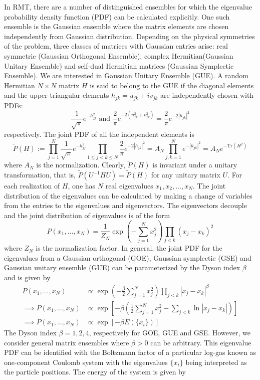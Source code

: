\documentclass[11pt]{article}
\begin{document}
In RMT, there are a number of distinguished ensembles for which the eigenvalue probability density function (PDF) can be calculated explicitly. One such ensemble is the Gaussian ensemble where the matrix elements are chosen independently from Gaussian distribution. Depending on the physical symmetries of the problem, three classes of matrices with Gaussian entries arise\cite{ref:mehta}: real symmetric (Gaussian Orthogonal Ensemble), complex Hermitian(Gaussian Unitary Ensemble) and self-dual Hermitian matrices (Gaussian Symplectic Ensemble). We are interested in Gaussian Unitary Ensemble (GUE). A random Hermitian $N\times N$ matrix $H$ is said to belong to the GUE if the diagonal elements and the upper triangular elements $h_{jk}=u_{jk}+iv_{jk}$ are independently chosen with PDFs:
$$
\frac{1}{\sqrt{\pi}}e^{-h_{jj}^2}\textrm{ and }\frac{2}{\pi}e^{-2(u_{jk}^2+v_{jk}^2)}=\frac{2}{\pi}e^{-2|h_{jk}|^2}
$$
respectively. The joint PDF of all the independent elements is
$$
\tilde{P}(H):=\prod_{j=1}^N\frac{1}{\sqrt{\pi}}e^{-h_{jj}^2}\prod_{1\leq j<k\leq N}\frac{2}{\pi}e^{-2|h_{jk}|^2} = A_N \prod_{j,k=1}^Ne^{-|h_{jk}|^2}= A_Ne^{-\textrm{Tr}(H^2)}
$$
where $A_N$ is the normalization. Clearly, $\tilde{P}(H)$ is invariant under a unitary transformation, that is, $\tilde{P}(U^{-1}HU)=\tilde{P}(H)$ for any unitary matrix $U$. For each realization of $H$, one has $N$ real eigenvalues $x_1,x_2,\dots,x_N$. The joint distribution of the eigenvalues can be calculated by making a change of variables from the entries to the eigenvalues and eigenvectors\cite{ref:mehta}. The eigenvectors decouple and the joint distribution of eigenvalues is of the form
\begin{equation}
P(x_1,\dots,x_N) = \frac{1}{Z_N}\exp\left(-\sum_{j=1}^Nx_j^2\right)\prod_{j<k}(x_j-x_k)^2
\end{equation} 
where $Z_N$ is the normalization factor. In general, the joint PDF for the eigenvalues from a Gaussian orthogonal (GOE), Gaussian symplectic (GSE) and Gaussian unitary ensemble (GUE) can be parameterized by the Dyson index $\beta$ and is given by
\begin{align}
P(x_1,\dots,x_N) &\propto \exp\left(-\frac{\beta}{2}\sum_{j=1}^Nx_j^2\right)\prod_{j<k}|x_j-x_k|^\beta\nonumber\\
\implies P(x_1,\dots,x_N) &\propto \exp\left[-\beta\left(\frac{1}{2}\sum_{j=1}^Nx_j^2-\sum_{j<k}\ln|x_j-x_k|\right)\right]\\
\implies P(x_1,\dots,x_N) &\propto \exp[-\beta E(\{x_i\})]
\end{align}
The Dyson index $\beta = 1,2,4$, respectively for GOE, GUE and GSE. However, we consider general matrix ensembles where $\beta >0$ can be arbitrary. This eigenvalue PDF can be identified with the Boltzmann factor of a particular log-gas known as one-component Coulomb system with the eigenvalues $\{x_i\}$ being interpreted as the particle positions. The energy of the system is given by
\end{document}
